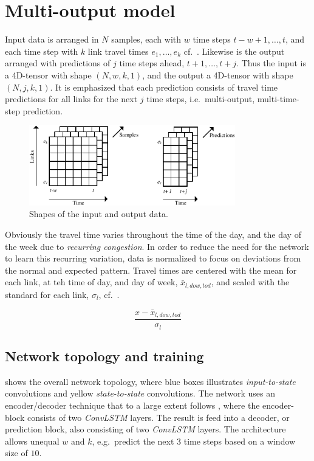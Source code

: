 \documentclass[preprint,12pt]{elsarticle}
\begin{document}
\section{Multi-output model}
\label{sec:model}


Input data is arranged in $N$ samples, each with $w$ time steps $t-w+1, \ldots, t$, and each time step with $k$ link travel times $e_1, \ldots, e_k$ cf.~. Likewise is the output arranged with predictions of $j$ time steps ahead, $t+1, \ldots, t+j$. Thus the input is a 4D-tensor with shape $(N, w, k, 1)$, and the output a 4D-tensor with shape $(N, j, k, 1)$. It is emphasized that each prediction consists of travel time predictions for all links for the next $j$ time steps, i.e.\ multi-output, multi-time-step prediction.
\begin{figure}[!ht]
  \centering
  \includegraphics[width=0.8\textwidth]{drawings/data_shape-crop.pdf}
  \caption{Shapes of the input and output data.}
  \label{fig:data_shape}
\end{figure}

Obviously the travel time varies throughout the time of the day, and the day of the week due to \emph{recurring congestion}. In order to reduce the need for the network to learn this recurring variation, data is normalized to focus on deviations from the normal and expected pattern. Travel times are centered with the mean for each link, at teh time of day, and day of week, $\mathit{\bar{x}_{l,\mathit{dow},\mathit{tod}}}$, and scaled with the standard for each link, $\sigma_l$, cf.\ .

\begin{equation}
  \frac{x - \bar{x}_{l,\mathit{dow},\mathit{tod}}}{\sigma_l}
  \label{eq:normalization}
\end{equation}

\subsection{Network topology and training}
 shows the overall network topology, where blue boxes illustrates \emph{input-to-state} convolutions and yellow \emph{state-to-state} convolutions. The network uses an encoder/decoder technique that to a large extent follows \cite{ConvLSTM}, where the encoder-block consists of two \emph{ConvLSTM} layers. The result is feed into a decoder, or prediction block, also consisting of two \emph{ConvLSTM} layers. The architecture allows unequal $w$ and $k$, e.g.\ predict the next $3$ time steps based on a window size of $10$.
\end{document}
